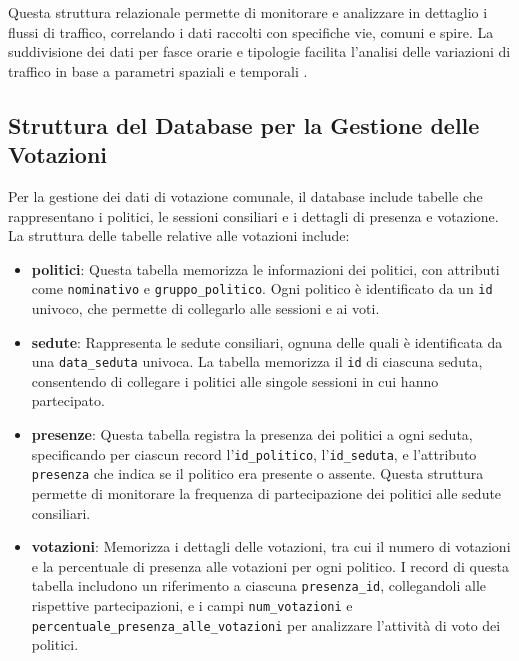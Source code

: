 Questa struttura relazionale permette di monitorare e analizzare in dettaglio i flussi di traffico, correlando i dati raccolti con specifiche vie, comuni e spire. La suddivisione dei dati per fasce orarie e tipologie facilita l'analisi delle variazioni di traffico in base a parametri spaziali e temporali \cite{date2019introduction}.

\subsection{Struttura del Database per la Gestione delle Votazioni}
Per la gestione dei dati di votazione comunale, il database include tabelle che rappresentano i politici, le sessioni consiliari e i dettagli di presenza e votazione. La struttura delle tabelle relative alle votazioni include:

\begin{itemize}
    \item \textbf{politici}: Questa tabella memorizza le informazioni dei politici, con attributi come \texttt{nominativo} e \texttt{gruppo\_politico}. Ogni politico è identificato da un \texttt{id} univoco, che permette di collegarlo alle sessioni e ai voti.

    \item \textbf{sedute}: Rappresenta le sedute consiliari, ognuna delle quali è identificata da una \texttt{data\_seduta} univoca. La tabella memorizza il \texttt{id} di ciascuna seduta, consentendo di collegare i politici alle singole sessioni in cui hanno partecipato.

    \item \textbf{presenze}: Questa tabella registra la presenza dei politici a ogni seduta, specificando per ciascun record l'\texttt{id\_politico}, l'\texttt{id\_seduta}, e l’attributo \texttt{presenza} che indica se il politico era presente o assente. Questa struttura permette di monitorare la frequenza di partecipazione dei politici alle sedute consiliari.

    \item \textbf{votazioni}: Memorizza i dettagli delle votazioni, tra cui il numero di votazioni e la percentuale di presenza alle votazioni per ogni politico. I record di questa tabella includono un riferimento a ciascuna \texttt{presenza\_id}, collegandoli alle rispettive partecipazioni, e i campi \texttt{num\_votazioni} e \texttt{percentuale\_presenza\_alle\_votazioni} per analizzare l’attività di voto dei politici.
\end{itemize}

